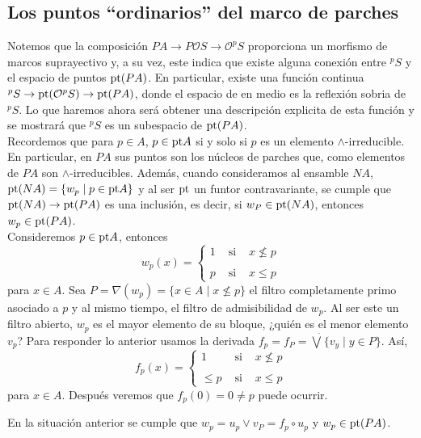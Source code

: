 \subsection{Los puntos ``ordinarios'' del marco de parches}

Notemos que la composición $PA\to P\mathcal{O}S\to \mathcal{O}^pS$ proporciona un morfismo de marcos suprayectivo y, a su vez, este indica que existe alguna conexión entre $^pS$ y el espacio de puntos $\mathrm{pt}(PA)$. En particular, existe una función continua $^pS\to \mathrm{pt}(\mathcal{O}^pS)\to \mathrm{pt} (PA)$, donde el espacio de en medio es la reflexión sobria de $^pS$. Lo que haremos ahora será obtener una descripción explicita de esta función y se mostrará que $^pS$ es un subespacio de $\mathrm{pt} (PA)$.\\

Recordemos que para $p\in A$, $p\in \mathrm{pt} A$ si y solo si $p$ es un elemento $\wedge$-irreducible. En particular, en $PA$ sus puntos son los núcleos de parches que, como elementos de $PA$ son $\wedge$-irreducibles. Además, cuando consideramos al ensamble $NA$, $\mathrm{pt} (NA)=\{w_p\mid p\in \mathrm{pt} A\}$ y al ser $\mathrm{pt}$ un funtor contravariante, se cumple que $\mathrm{pt}(NA)\to \mathrm{pt}(PA)$ es una inclusión, es decir, si $w_P\in \mathrm{pt}(NA)$, entonces $w_p\in \mathrm{pt}(PA)$.\\

Consideremos $p\in \mathrm{pt} A$, entonces 
\[
w_p(x)= \left\{ \begin{array}{lcc} 1 & \mbox{ si } & x \nleq p \\ \\ p & \mbox{ si } & x \leq p \end{array} \right.
\]
para $x\in A$. Sea $P=\nabla(w_p)=\{x\in A\mid x\nleq p\}$ el filtro completamente primo asociado a $p$ y al mismo tiempo, el filtro de admisibilidad de $w_p$. Al ser este un filtro abierto, $w_p$ es el mayor elemento de su bloque, ¿quién es el menor elemento $v_p$? Para responder lo anterior usamos la derivada $f_p=f_P=\dot{\bigvee}\{v_y\mid y\in P\}$. Así,
\[
f_p(x)= \left\{ \begin{array}{lcc} 1 & \mbox{ si } & x \nleq p \\ \\ \leq p & \mbox{ si } & x \leq p \end{array} \right.
\]
para $x\in A$. Después veremos que $f_p(0)=0\neq p$ puede ocurrir.

\begin{lem}\label{Lema9.3.1}
    En la situación anterior se cumple que $w_p=u_p\vee v_P=f_p\circ u_p$ y $w_p\in \mathrm{pt} (PA)$.
\end{lem}


